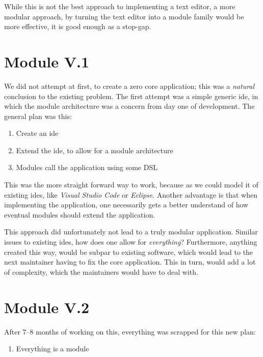 While this is not the best approach to implementing a text editor, a more
modular approach, by turning the text editor into a module family would be more
effective, it is good enough as a stop-gap.

\section{Module V.1} \label{sec:mod1}

We did not attempt at first, to create a zero core application; this was a
\textit{natural} conclusion to the existing problem. The first attempt was a
simple generic \gls{ide}, in which the module architecture was a concern from
day one of development. The general plan was this:

\begin{enumerate}
  \item Create an \gls{ide}
  \item Extend the \gls{ide}, to allow for a module architecture
  \item Modules call the application using some DSL
\end{enumerate}

This was the more straight forward way to work, because as we could model it of
existing \gls{ide}s, like \textit{Visual Studio Code} or \textit{Eclipse}.
Another advantage is that when implementing the application, one necessarily
gets a better understand of how eventual modules should extend the application.

This approach did unfortunately not lead to a truly modular application. Similar
issues to existing \gls{ide}s, how does one allow for \textit{everything}?
Furthermore, anything created this way, would be subpar to existing software,
which would lead to the next maintainer having to fix the core application. This
in turn, would add a lot of complexity, which the maintainers would have to deal with.

\section{Module V.2} \label{sec:mod2}

After 7–8 months of working on this, everything was scrapped for this new plan:

\begin{enumerate}
  \item Everything is a module
\end{enumerate}

